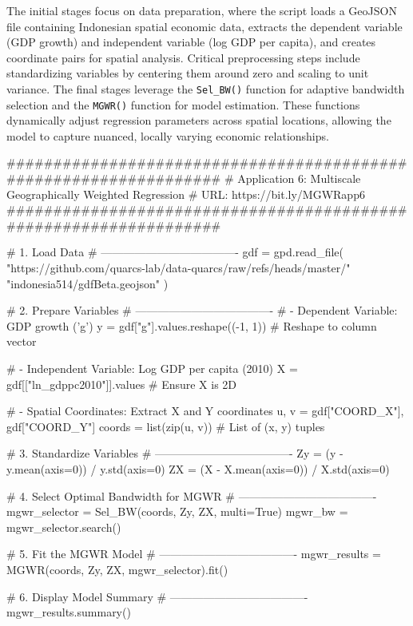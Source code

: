 \documentclass[smallextended, natbib]{svjour3}       %
\begin{document}
The initial stages focus on data preparation, where the script loads a GeoJSON file containing Indonesian spatial economic data, extracts the dependent variable (GDP growth) and independent variable (log GDP per capita), and creates coordinate pairs for spatial analysis.
Critical preprocessing steps include standardizing variables by centering them around zero and scaling to unit variance. 
The final stages leverage the \verb|Sel_BW()| function for adaptive bandwidth selection and the \verb|MGWR()| function for model estimation. 
These functions dynamically adjust regression parameters across spatial locations, allowing the model to capture nuanced, locally varying economic relationships.

\begin{python}
##################################################################
# Application 6: Multiscale Geographically Weighted Regression
# URL: https://bit.ly/MGWRapp6
##################################################################

# 1. Load Data
# -------------------------------------
gdf = gpd.read_file(
    "https://github.com/quarcs-lab/data-quarcs/raw/refs/heads/master/"
    "indonesia514/gdfBeta.geojson"
)

# 2. Prepare Variables
# -------------------------------------
# - Dependent Variable: GDP growth ('g')
y = gdf["g"].values.reshape((-1, 1))  # Reshape to column vector

# - Independent Variable: Log GDP per capita (2010)
X = gdf[["ln_gdppc2010"]].values  # Ensure X is 2D

# - Spatial Coordinates: Extract X and Y coordinates
u, v = gdf["COORD_X"], gdf["COORD_Y"]
coords = list(zip(u, v))  # List of (x, y) tuples

# 3. Standardize Variables
# -------------------------------------
Zy = (y - y.mean(axis=0)) / y.std(axis=0)
ZX = (X - X.mean(axis=0)) / X.std(axis=0)

# 4. Select Optimal Bandwidth for MGWR
# -------------------------------------
mgwr_selector = Sel_BW(coords, Zy, ZX, multi=True)
mgwr_bw = mgwr_selector.search()

# 5. Fit the MGWR Model
# -------------------------------------
mgwr_results = MGWR(coords, Zy, ZX, mgwr_selector).fit()

# 6. Display Model Summary
# -------------------------------------
mgwr_results.summary()
\end{python}
\end{document}
